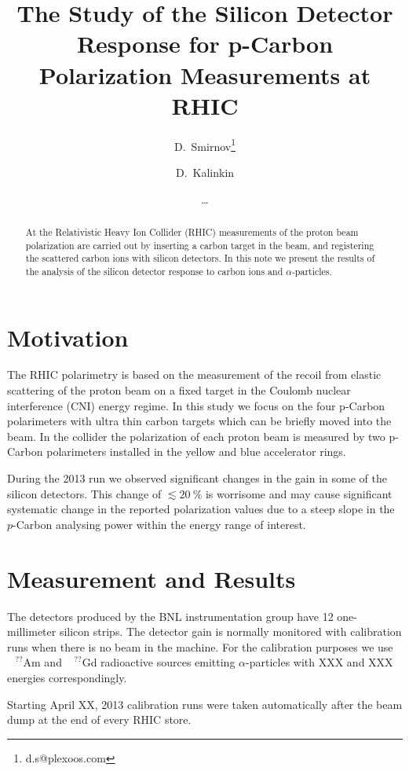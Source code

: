 \documentclass[a4paper,12pt]{article}
\title{The Study of the Silicon Detector Response for p-Carbon Polarization Measurements at RHIC}
\author[1]{D.~Smirnov\thanks{d.s@plexoos.com}}
\author[2]{D.~Kalinkin}
\author[]{\ldots}
\affil[1]{Brookhaven National Lab}
\affil[2]{ITEP}
\begin{document}
\maketitle

\begin{abstract}

At the Relativistic Heavy Ion Collider (RHIC) measurements of the proton beam
polarization are carried out by inserting a carbon target in the beam, and
registering the scattered carbon ions with silicon detectors. In this note we
present the results of the analysis of the silicon detector response to carbon
ions and $\alpha$-particles.

\end{abstract}


\section{Motivation}

The RHIC polarimetry is based on the measurement of the recoil from elastic
scattering of the proton beam on a fixed target in the Coulomb nuclear
interference (CNI) energy regime. In this study we focus on the four p-Carbon
polarimeters with ultra thin carbon targets which can be briefly moved into the
beam. In the collider the polarization of each proton beam is measured by two
p-Carbon polarimeters installed in the yellow and blue accelerator rings.

During the 2013 run we observed significant changes in the gain in some of the
silicon detectors. This change of $\lesssim 20~\%$ is worrisome and may cause
significant systematic change in the reported polarization values due to a steep
slope in the $p$-Carbon analysing power within the energy range of interest.


\section{Measurement and Results}

The detectors produced by the BNL instrumentation group have 12 one-millimeter
silicon strips. The detector gain is normally monitored with calibration runs
when there is no beam in the machine. For the calibration purposes we use
$\phantom{A}^{??}$Am and $\phantom{G}^{??}$Gd radioactive sources emitting
$\alpha$-particles with XXX and XXX energies correspondingly.

Starting April XX, 2013 calibration runs were taken automatically after the beam
dump at the end of every RHIC store.
\end{document}
